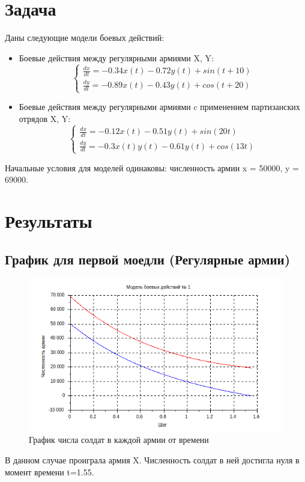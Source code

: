 \documentclass[unicode, 12pt, a4paper,oneside]{article}
\begin{document}
    \section{Задача}
    Даны следующие модели боевых действий:
    \begin{itemize}
        \item Боевые действия между регулярными армиями X, Y:
        $$
        \begin{cases}
        \frac{dx}{dt} = -0.34x(t) - 0.72y(t) + sin(t + 10) \\
        \frac{dy}{dt} = -0.89x(t) - 0.43y(t) + cos(t + 20)
        \end{cases}
        $$
        \item Боевые действия между регулярными армиями c применением партизанских отрядов X, Y:
        $$
        \begin{cases}
        \frac{dx}{dt} = -0.12x(t) - 0.51y(t) + sin(20t) \\
        \frac{dy}{dt} = -0.3x(t)y(t) - 0.61y(t) + cos(13t)
        \end{cases}
        $$
    \end{itemize}
    Начальные условия для моделей одинаковы: численность армии x = 50000, y = 69000.
    
    \section{Результаты}
    \subsection{График для первой моедли (Регулярные армии)}
    \begin{figure}[H]
        \centering
        \includegraphics{lab02/lab2-graph0.png}
        \caption{График числа солдат в каждой армии от времени}
        \label{fig:model1}
    \end{figure}
    В данном случае проиграла армия X. Численность солдат в ней достигла нуля в момент времени t=1.55.
\end{document}
